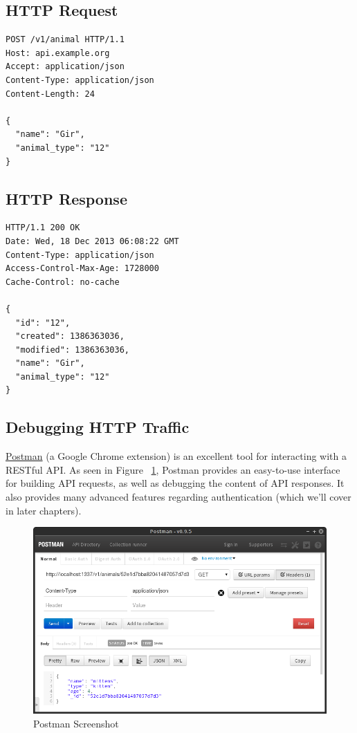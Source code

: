 \documentclass{book}
\begin{document}
\subsection{HTTP Request}

\begin{verbatim}
POST /v1/animal HTTP/1.1
Host: api.example.org
Accept: application/json
Content-Type: application/json
Content-Length: 24

{
  "name": "Gir",
  "animal_type": "12"
}
\end{verbatim}

\subsection{HTTP Response}

\begin{verbatim}
HTTP/1.1 200 OK
Date: Wed, 18 Dec 2013 06:08:22 GMT
Content-Type: application/json
Access-Control-Max-Age: 1728000
Cache-Control: no-cache

{
  "id": "12",
  "created": 1386363036,
  "modified": 1386363036,
  "name": "Gir",
  "animal_type": "12"
}
\end{verbatim}

\subsection{Debugging HTTP Traffic}

\href{http://getpostman.com/}{Postman} (a Google Chrome extension) is an excellent tool for interacting with a RESTful API. As seen in Figure ~\ref{fig:postman}, Postman provides an easy-to-use interface for building API requests, as well as debugging the content of API responses. It also provides many advanced features regarding authentication (which we'll cover in later chapters).

\begin{figure}[ht!]
\centering
\includegraphics[width=140mm]{images/postman.png}
\caption{Postman Screenshot}
\label{fig:postman}
\end{figure}
\end{document}
